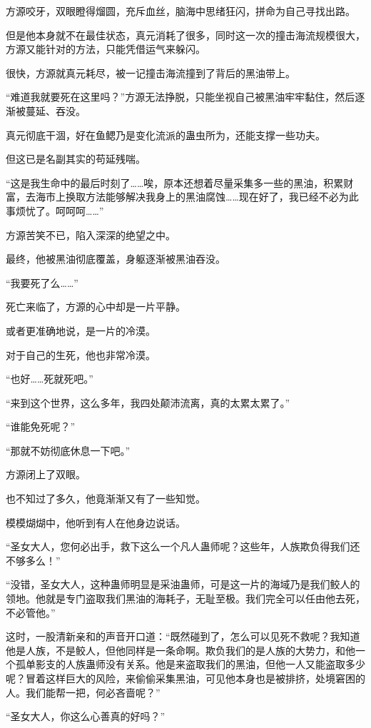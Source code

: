 \begin{this_body}
方源咬牙，双眼瞪得熘圆，充斥血丝，脑海中思绪狂闪，拼命为自己寻找出路。

但是他本身就不在最佳状态，真元消耗了很多，同时这一次的撞击海流规模很大，方源又能针对的方法，只能凭借运气来躲闪。

很快，方源就真元耗尽，被一记撞击海流撞到了背后的黑油带上。

“难道我就要死在这里吗？”方源无法挣脱，只能坐视自己被黑油牢牢黏住，然后逐渐被蔓延、吞没。

真元彻底干涸，好在鱼鳃乃是变化流派的蛊虫所为，还能支撑一些功夫。

但这已是名副其实的苟延残喘。

“这是我生命中的最后时刻了……唉，原本还想着尽量采集多一些的黑油，积累财富，去海市上换取方法能够解决我身上的黑油腐蚀……现在好了，我已经不必为此事烦忧了。呵呵呵……”

方源苦笑不已，陷入深深的绝望之中。

最终，他被黑油彻底覆盖，身躯逐渐被黑油吞没。

“我要死了么……”

死亡来临了，方源的心中却是一片平静。

或者更准确地说，是一片的冷漠。

对于自己的生死，他也非常冷漠。

“也好……死就死吧。”

“来到这个世界，这么多年，我四处颠沛流离，真的太累太累了。”

“谁能免死呢？”

“那就不妨彻底休息一下吧。”

方源闭上了双眼。

也不知过了多久，他竟渐渐又有了一些知觉。

模模煳煳中，他听到有人在他身边说话。

“圣女大人，您何必出手，救下这么一个凡人蛊师呢？这些年，人族欺负得我们还不够多么！”

“没错，圣女大人，这种蛊师明显是采油蛊师，可是这一片的海域乃是我们鲛人的领地。他就是专门盗取我们黑油的海耗子，无耻至极。我们完全可以任由他去死，不必管他。”

这时，一股清新亲和的声音开口道：“既然碰到了，怎么可以见死不救呢？我知道他是人族，不是鲛人，但他同样是一条命啊。欺负我们的是人族的大势力，和他一个孤单影支的人族蛊师没有关系。他是来盗取我们的黑油，但他一人又能盗取多少呢？冒着这样巨大的风险，来偷偷采集黑油，可见他本身也是被排挤，处境窘困的人。我们能帮一把，何必吝啬呢？”

“圣女大人，你这么心善真的好吗？”


\end{this_body}
